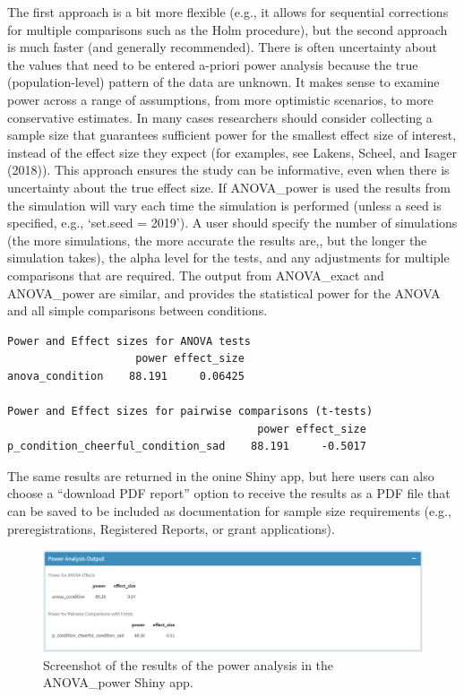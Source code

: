 \documentclass[,man,floatsintext]{apa6}
\begin{document}
The first approach is a bit more flexible (e.g., it allows for sequential corrections for multiple comparisons such as the Holm procedure), but the second approach is much faster (and generally recommended).
There is often uncertainty about the values that need to be entered a-priori power analysis because the true (population-level) pattern of the data are unknown.
It makes sense to examine power across a range of assumptions, from more optimistic scenarios, to more conservative estimates.
In many cases researchers should consider collecting a sample size that guarantees sufficient power for the smallest effect size of interest, instead of the effect size they expect (for examples, see Lakens, Scheel, and Isager (2018)).
This approach ensures the study can be informative, even when there is uncertainty about the true effect size.
If ANOVA\_power is used the results from the simulation will vary each time the simulation is performed (unless a seed is specified, e.g., `set.seed = 2019').
A user should specify the number of simulations (the more simulations, the more accurate the results are,, but the longer the simulation takes), the alpha level for the tests, and any adjustments for multiple comparisons that are required.
The output from ANOVA\_exact and ANOVA\_power are similar, and provides the statistical power for the ANOVA and all simple comparisons between conditions.

\begin{verbatim}
Power and Effect sizes for ANOVA tests
                    power effect_size
anova_condition    88.191     0.06425

Power and Effect sizes for pairwise comparisons (t-tests)
                                       power effect_size
p_condition_cheerful_condition_sad    88.191     -0.5017
\end{verbatim}

The same results are returned in the onine Shiny app, but here users can also choose a \enquote{download PDF report} option to receive the results as a PDF file that can be saved to be included as documentation for sample size requirements (e.g., preregistrations, Registered Reports, or grant applications).

\begin{figure}
\centering
\includegraphics{screenshots/anova_power_result.png}
\caption{Screenshot of the results of the power analysis in the ANOVA\_power Shiny app.}
\end{figure}
\end{document}
